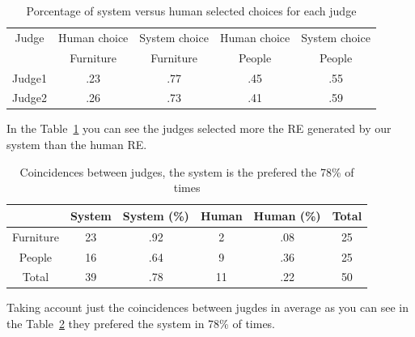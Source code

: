 \begin{table}[h!]
\begin{center}
\begin{tabular}{|c|c|c|c|c|}
\hline
Judge    & Human choice & System choice  & Human choice & System choice \\
	 &    Furniture &    Furniture   &    People    &    People \\
\hline 
Judge1   & .23       & .77      & .45  & .55  \\
Judge2   & .26       & .73      & .41  & .59  \\
\hline
\end{tabular}
\caption{Porcentage of system versus human selected choices for each judge} 
\label{system-versus-human}
\end{center}
\end{table}
In the Table~\ref{system-versus-human} you can see the judges selected more the RE generated by our system than the human RE.



\begin{table}[h!]
\begin{center}
\begin{tabular}{|c|c|c|c|c|c|}
\hline
           & System & System (\%) & Human & Human (\%) & Total\\
\hline
Furniture & 23  & .92 &  2 & .08  & 25 \\
People    & 16  & .64 & 9  & .36 & 25 \\
\hline
Total     & 39  & .78    & 11 & .22 & 50  \\
\hline
\end{tabular}
\caption{Coincidences between judges, the system is the prefered the 78\% of times} 
\label{system-better}
\end{center}
\end{table}
Taking account just the coincidences between jugdes in average as you can see in the Table~\ref{system-better} they prefered the system in 78\% of times.

